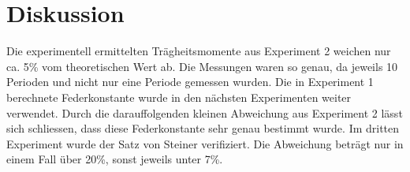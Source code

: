 \documentclass[12pt,a4paper]{article}
\begin{document}
\section*{Diskussion}
Die experimentell ermittelten Tr\"agheitsmomente aus Experiment 2 weichen nur ca. 5\% vom theoretischen Wert ab. Die Messungen waren so genau, da jeweils 10 Perioden und nicht nur eine Periode gemessen wurden.
Die in Experiment 1 berechnete Federkonstante wurde in den n\"achsten Experimenten weiter verwendet. Durch die darauffolgenden kleinen Abweichung aus Experiment 2 l\"asst sich schliessen, dass diese Federkonstante sehr genau bestimmt wurde.
Im dritten Experiment wurde der Satz von Steiner verifiziert. Die Abweichung betr\"agt nur in einem Fall \"uber 20\%, sonst jeweils unter 7\%.
\end{document}

